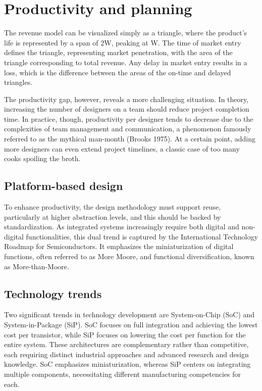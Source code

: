 \section{Productivity and planning}

The revenue model can be visualized simply as a triangle, where the product's life is represented by a span of 2W, peaking at W. 
The time of market entry defines the triangle, representing market penetration, with the area of the triangle corresponding to total revenue.
Any delay in market entry results in a loss, which is the difference between the areas of the on-time and delayed triangles.

The productivity gap, however, reveals a more challenging situation. 
In theory, increasing the number of designers on a team should reduce project completion time. 
In practice, though, productivity per designer tends to decrease due to the complexities of team management and communication, a phenomenon famously referred to as the mythical man-month (Brooks 1975). 
At a certain point, adding more designers can even extend project timelines, a classic case of too many cooks spoiling the broth.

\subsection{Platform-based design}
To enhance productivity, the design methodology must support reuse, particularly at higher abstraction levels, and this should be backed by standardization. 
As integrated systems increasingly require both digital and non-digital functionalities, this dual trend is captured by the International Technology Roadmap for Semiconductors. 
It emphasizes the miniaturization of digital functions, often referred to as More Moore, and functional diversification, known as More-than-Moore.

\subsection{Technology trends}
Two significant trends in technology development are System-on-Chip (SoC) and System-in-Package (SiP). 
SoC focuses on full integration and achieving the lowest cost per transistor, while SiP focuses on lowering the cost per function for the entire system. 
These architectures are complementary rather than competitive, each requiring distinct industrial approaches and advanced research and design knowledge. 
SoC emphasizes miniaturization, whereas SiP centers on integrating multiple components, necessitating different manufacturing competencies for each.


